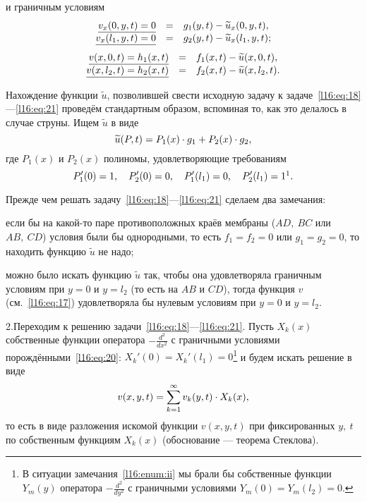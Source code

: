 \documentclass[12pt,a4paper,openany,fleqn]{book}
\newcommand{\dder}[2]{\ensuremath{\frac{d^2#1}{d#2^2}}}
\theoremstyle{definition}
\begin{document}
	и граничным условиям
	\begin{equation}\label{l16:eq:20}
		\hfill\begin{array}{rcl}
			\underline{v_x(0,y,t)=0}&=&g_1(y,t)-\widetilde{u}_x(0,y,t),\\
			\underline{v_x(l_1,y,t)=0}&=&g_2(y,t)-\widetilde{u}_x(l_1,y,t);
		\end{array} \hfill
	\end{equation}
	\begin{equation}\label{l16:eq:21}
		\hfill\begin{array}{rcl}
			\underline{v(x,0,t)=h_1(x,t)}&=&f_1(x,t)-\widetilde{u}(x,0,t),\\
			\underline{v(x,l_2,t)=h_2(x,t)}&=&f_2(x,t)-\widetilde{u}(x,l_2,t).
		\end{array} \hfill
	\end{equation}
	
	Нахождение функции $\widetilde{u}$, позволившей свести исходную задачу к задаче~\eqref{l16:eq:18}---\eqref{l16:eq:21} проведём стандартным образом, вспоминая то, как это делалось в случае струны. Ищем $\widetilde{u}$ в виде
	\begin{equation*}
		\hfill\widetilde{u}(P,t)=P_1(x)\cdot g_1+P_2(x)\cdot g_2,\hfill
	\end{equation*}
	где $P_1(x)$ и $P_2(x)$ полиномы, удовлетворяющие требованиям 
	\begin{equation*}
		\hfill P'_1(0)=1,\quad P'_2(0)=0,\quad P'_1(l_1)=0,\quad P'_2(l_1)=1\footnotemark{}.\hfill
	\end{equation*}

	Прежде чем решать задачу~\eqref{l16:eq:18}---\eqref{l16:eq:21} сделаем два замечания:
	\begin{enumeraterm}
		\item если бы на какой-то паре противоположных краёв мембраны ($AD,\ BC$ или $AB,\ CD$) условия были бы однородными, то есть $f_1=f_2=0$ или $g_1=g_2=0$, то находить функцию $\widetilde{u}$ не надо;
		\item\label{l16:enum:ii} можно было искать функцию $\widetilde{u}$ так, чтобы она удовлетворяла граничным условиям при $y=0$ и $y=l_2$ (то есть на $AB$ и $CD$), тогда функция $v$ (см.~\eqref{l16:eq:17}) удовлетворяла бы нулевым условиям при $y=0$ и $y=l_2$.
	\end{enumeraterm}
	2.\quad Переходим к решению задачи~\eqref{l16:eq:18}---\eqref{l16:eq:21}. Пусть $X_k(x)$ собственные функции оператора $\displaystyle-\dder{}{x}$ с граничными условиями порождёнными~\eqref{l16:eq:20}: $X_k'(0)=X_k'(l_1)=0$\footnote{В ситуации замечания~\ref{l16:enum:ii} мы брали бы собственные функции $Y_m(y)$ оператора $-\displaystyle\dder{}{y}$ с граничными условиями $Y_m(0)=Y_m(l_2)=0$.} и будем искать решение в виде 
	\begin{equation}\label{l16:eq:22}
		\hfill v(x,y,t)=\sum\limits_{k=1}^{\infty}v_k(y,t)\cdot X_k(x),\hfill
	\end{equation}
	то есть в виде разложения искомой функции $v(x,y,t)$ при фиксированных $y,\ t$ по собственным функциям $X_k(x)$ (обоснование --- теорема Стеклова).
	
\end{document}
